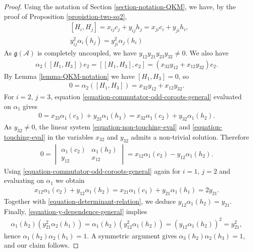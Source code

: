 \documentclass[12pt, a4paper, reqno]{amsart}
\theoremstyle{definition}
\theoremstyle{definition}
\theoremstyle{definition}
\numberwithin{theorem}{section}
\numberwithin{lemma}{section}
\numberwithin{remark}{section}
\numberwithin{definition}{section}
\numberwithin{corollary}{section}
\numberwithin{proposition}{section}
\numberwithin{example}{section}
\begin{document}
	\begin{proof}
		Using the notation of Section \ref{section-notation-QKM}, we have, by the proof of Proposition \ref{propistion-two-sq2},
		\begin{align}
			&[H_i,H_j] = x_{ij}c_j + y_{ij}h_j = x_{ji}c_i + y_{ji}h_i, \label{equation-commutator-odd-coroots-general}\\
			&y_{ij}^2\alpha_i(h_j) = y_{ji}^2 \alpha_j(h_i) \label{equation-y-dependence-general}
		\end{align}
		As \(\mathfrak{g}(\mathcal{A})\) is completely uncoupled, we have \(y_{12}y_{21}y_{23}y_{32} \neq 0\). We also have
		\begin{align*}
			\alpha_2([H_1,H_3]) e_2 = [[H_1,H_3],e_2] = (x_{32}y_{12} + x_{12}y_{32})e_2.
		\end{align*}
		By Lemma \ref{lemma-QKM-notation} we have \([H_1,H_3] = 0\), so 
		\begin{align}\label{equation-non-touching-eval}
			0=\alpha_2([H_1,H_3]) = x_{32}y_{12} + x_{12}y_{32}.
		\end{align}
		For \(i=2\), \(j=3\), equation \eqref{equation-commutator-odd-coroots-general} evaluated on \(\alpha_1\) gives
		\begin{align}\label{equation-touching-eval}
			0 = x_{23}\alpha_1(c_3) + y_{23}\alpha_1(h_3) =x_{32}\alpha_1(c_2) + y_{32}\alpha_1(h_2).
		\end{align}
		As \(y_{32} \neq 0\), the linear system \eqref{equation-non-touching-eval} and \eqref{equation-touching-eval} in the variables \(x_{32}\) and \(y_{32}\) admits a non-trivial solution. Therefore
		\begin{align}\label{equation-determinant-relation}
			0 = \begin{vmatrix}
				\alpha_1(c_2) & \alpha_1(h_2) \\ y_{12} & x_{12} 
			\end{vmatrix} = x_{12}\alpha_1(c_2) - y_{12}\alpha_1(h_2).
		\end{align}
		Using \eqref{equation-commutator-odd-coroots-general} again for \(i=1\), \(j=2\) and evaluating on \(\alpha_1\) we obtain
		\begin{align*}
			x_{12}\alpha_1(c_2) + y_{12}\alpha_1(h_2) = x_{21}\alpha_1(c_1) + y_{21}\alpha_1(h_1) = 2y_{21}.
		\end{align*}
		Together with \eqref{equation-determinant-relation}, we deduce \(y_{12}\alpha_1(h_2) = y_{21}\). Finally, \eqref{equation-y-dependence-general} implies
		\begin{align*}
			\alpha_1(h_2) (y_{21}^2\alpha_2(h_1)) = \alpha_1(h_2)(y_{12}^2\alpha_1(h_2)) = (y_{12}\alpha_1(h_2))^2 = y_{21}^2,
		\end{align*}
		hence \(\alpha_1(h_2)\alpha_2(h_1) = 1\). A symmetric argument gives \(\alpha_3(h_2)\alpha_2(h_3) = 1\), and our claim follows.
	\end{proof}
	
\end{document}
